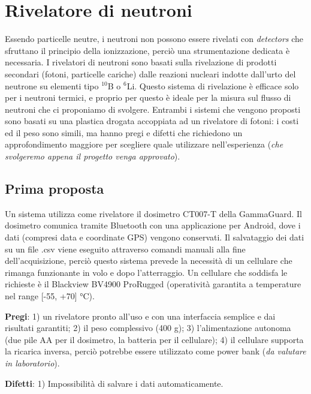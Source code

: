 \section{Rivelatore di neutroni}
Essendo particelle neutre, i neutroni non possono essere rivelati con \emph{detectors} che sfruttano il principio della ionizzazione, perciò una strumentazione dedicata è necessaria. I rivelatori di neutroni sono basati sulla rivelazione di prodotti secondari (fotoni, particelle cariche) dalle reazioni nucleari indotte dall'urto del neutrone su elementi tipo $^{10}$B o $^6$Li. Questo sistema di rivelazione è efficace solo per i neutroni termici, e proprio per questo è ideale per la misura sul flusso di neutroni che ci proponiamo di svolgere. Entrambi i sistemi che vengono proposti sono basati su una plastica drogata accoppiata ad un rivelatore di fotoni: i costi ed il peso sono simili, ma hanno pregi e difetti che richiedono un approfondimento maggiore per scegliere quale utilizzare nell'esperienza (\emph{che svolgeremo appena il progetto venga approvato}). 

\subsection{Prima proposta}
Un sistema utilizza come rivelatore il dosimetro CT007-T della GammaGuard. Il dosimetro comunica tramite Bluetooth con una applicazione per Android, dove i dati (compresi data e coordinate GPS) vengono conservati. Il salvataggio dei dati su un file .csv viene eseguito attraverso comandi manuali alla fine dell'acquisizione, perciò questo sistema prevede la necessità di un cellulare che rimanga funzionante in volo e dopo l'atterraggio. Un cellulare che soddisfa le richieste è il Blackview BV4900 ProRugged (operatività garantita a temperature nel range [-55, +70] °C). 

\textbf{Pregi}: 1) un rivelatore pronto all'uso e con una interfaccia semplice e dai risultati garantiti; 2) il peso complessivo (400 g); 3) l'alimentazione autonoma (due pile AA per il dosimetro, la batteria per il cellulare); 4) il cellulare supporta la ricarica inversa, perciò potrebbe essere utilizzato come power bank (\emph{da valutare in laboratorio}). 

\textbf{Difetti}: 1) Impossibilità di salvare i dati automaticamente. 

